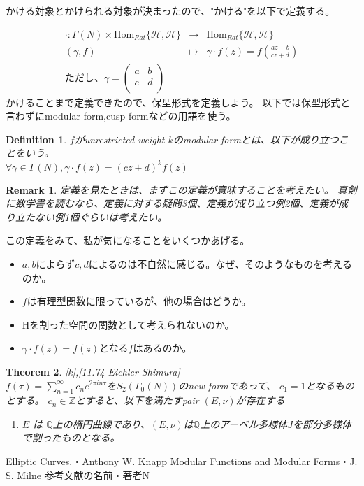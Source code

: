 \documentclass{ujarticle}
\newtheorem{thm}{Theorem}[section]
\newtheorem{dfn}[thm]{Definition}
\newtheorem*{rem}{Remark}
\begin{document}
\noindent かける対象とかけられる対象が決まったので、"かける"を以下で定義する。

\begin{eqnarray*}
  \cdot :  \Gamma(N) \times \mathrm{Hom}_{Rat}\{\mathcal{H},\mathcal{H}\} & \to & \mathrm{Hom}_{Rat}\{\mathcal{H},\mathcal{H}\} \\
  (\gamma,f) &\mapsto &\gamma \cdot f(z) = f(\frac{az + b}{cz + d})　\\
\mbox{ただし、} \gamma =
\begin{pmatrix}
  a & b \\
  c & d \\
\end{pmatrix}
\end{eqnarray*}
かけることまで定義できたので、保型形式を定義しよう。
以下では保型形式と言わずにmodular form,cusp formなどの用語を使う。

\begin{dfn}
  $f$がunrestricted weight $k$のmodular formとは、以下が成り立つことをいう。 \\
  $\forall  \gamma \in \Gamma(N),  \gamma \cdot f(z) = (cz + d)^{k}f(z)$
\end{dfn}
\begin{rem}
  定義を見たときは、まずこの定義が意味することを考えたい。
  真剣に数学書を読むなら、定義に対する疑問3個、定義が成り立つ例2個、定義が成り立たない例1個ぐらいは考えたい。
\end{rem}
この定義をみて、私が気になることをいくつかあげる。
\begin{itemize}
  \setlength{\parskip}{0cm} %
  \setlength{\itemsep}{0cm} %
  \item $a,b$によらず$c,d$によるのは不自然に感じる。なぜ、そのようなものを考えるのか。
  \item $f$は有理型関数に限っているが、他の場合はどうか。
  \item $\mathrm{H}$を割った空間の関数として考えられないのか。
  \item $\gamma \cdot f (z) = f(z)$となる$f$はあるのか。
\end{itemize}


\begin{thm}{[k],[11.74 Eichler-Shimura]} \\
  $f(\tau)=\sum_{n=1}^{\infty}c_ne^{2 \pi i n \tau}$を$S_2(\Gamma_0(N))$のnew formであって、
  $c_1=1$となるものとする。 $c_n \in \mathbb{Z}$とすると、以下を満たすpair $(E, \nu)$が存在する
  \begin{enumerate}
    \item $E$ は $\mathbb{Q}$上の楕円曲線であり、$(E, \nu)$は$\mathbb{Q}$上のアーベル多様体$J$を部分多様体で割ったものとなる。
  \end{enumerate}

\end{thm}


\begin{thebibliography}{数字}
   Elliptic Curves.・Anthony W. Knapp
   Modular Functions and Modular Forms・J. S. Milne
   参考文献の名前・著者N
\end{thebibliography}
\end{document}
